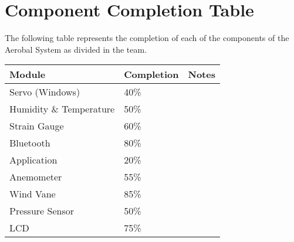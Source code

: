 \section{Component Completion Table}

	The following table represents the completion of each of the components of the Aerobal System as divided in the team.
	\\

	\noindent
	\renewcommand{\arraystretch}{2.5}
	\begin{tabular}{|p{4.0cm}|p{2.5cm}|p{8.0cm}|}
		\hline
			\textbf{Module} & \textbf{Completion} & \textbf{Notes}\\
		\hline
			Servo (Windows) & 40\% & \\
		\hline
			Humidity \& Temperature & 50\% & \\
		\hline
			Strain Gauge & 60\% & \\
		\hline
			Bluetooth & 80\% & \\
		\hline
			Application & 20\% & \\
		\hline
			Anemometer & 55\% & \\
		\hline
			Wind Vane & 85\% & \\
		\hline
			Pressure Sensor & 50\% & \\
		\hline
			LCD &  75\% & \\
		\hline
	\end{tabular} \\

\newpage